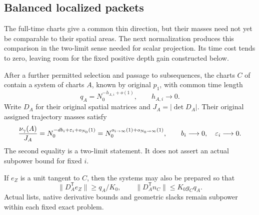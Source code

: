 \subsection{Balanced localized packets}

The full-time charts give a common thin direction, but their masses
need not yet be comparable to their spatial areas.  The next
normalization produces this comparison in the two-limit sense needed
for scalar projection.  Its time cost tends to zero, leaving room for
the fixed positive depth gain constructed below.

\begin{lemma}
 \label{a08:balanced-packets}
 After a further permitted selection and passage to subsequences, the
 charts \(C\) of  contain a system of
 charts \(A\), known by original \(p_1\), with common time length
 \[
 q_A=N_0^{-h_{A,i}+o(1)},\qquad h_{A,i}\longrightarrow0.
 \]
 Write \(D_A\) for their original spatial matrices and
 \(J_A=|\det D_A|\).  Their original assigned trajectory masses satisfy
 \begin{equation}
  \label{a08:balanced-density}
  \frac{\nu_\gamma(A)}{J_A}
   =N_0^{-db_i+\varepsilon_i+o_{N_0}(1)}
   =N_0^{o_{i\to\infty}(1)+o_{N_0\to\infty}(1)},
  \qquad b_i\longrightarrow0,\quad \varepsilon_i\longrightarrow0.
 \end{equation}
 The second equality is a two-limit statement.  It does not assert an
 actual subpower bound for fixed \(i\).

 If \(e_Z\) is a unit tangent to \(C\), then the systems may also be
 prepared so that
 \begin{equation}
  \label{a08:tangential-fullness}
  \|D_A^{\mathsf T}e_Z\|\ge q_A/K_0,\qquad
  \|D_A^{\mathsf T}n_C\|\le K_0g_Cq_A.
 \end{equation}
 Actual lists, native derivative bounds and geometric slacks remain
 subpower within each fixed exact problem.
\end{lemma}

